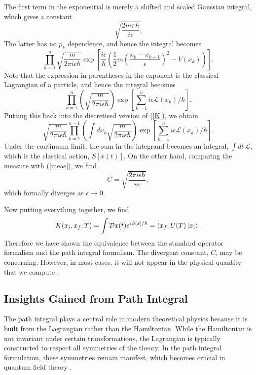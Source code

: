 \documentclass[12pt,a4paper]{article}
\begin{document}
The first term in the exponential is merely a shifted and scaled Gaussian integral, which gives a constant
\begin{equation}
    \sqrt{\frac{2m\pi\hbar}{i\epsilon}}.
\end{equation}
The latter has no $p_k$ dependence, and hence the integral becomes
\begin{equation}
     \prod_{k=1}^n\sqrt{\frac{m}{2\pi i\epsilon\hbar}}\exp\left[\frac{i\epsilon}{\hbar}\left(\frac{1}{2}m\left(\frac{x_k-x_{k-1}}{\epsilon}\right)^2 - V(x_k)\right)\right].
\end{equation}
Note that the expression in parentheses in the exponent is the classical Lagrangian of a particle, and hence the integral becomes
\begin{equation}
    \prod_{k=1}^n\left(\sqrt{\frac{m}{2\pi i\epsilon\hbar}}\right)\exp\left[\sum_{k=1}^ni\epsilon\mathcal{L}(x_k)/\hbar\right].
\end{equation}
Putting this back into the discretised version of (\ref{K}), we obtain
\begin{equation}
    \sqrt{\frac{m}{2\pi i\epsilon\hbar}}\prod_{k=1}^{n-1}\left(\int dx_k\sqrt{\frac{m}{2\pi i\epsilon\hbar}}\right)\exp\left[\sum_{k=1}^ni\epsilon\mathcal{L}(x_k)/\hbar\right].
\end{equation}
Under the continuum limit, the sum in the integrand becomes an integral, $\int dt \,\mathcal{L}$, which is the classical action,  $S[x(t)]$. On the other hand, comparing the measure with (\ref{meas}), we find
\begin{equation}
    C  = \sqrt{\frac{2\pi i\epsilon\hbar}{m}},
\end{equation}
which formally diverges as $\epsilon \to 0$. 

Now putting everything together, we find
\begin{equation}
    K(x_i,x_f;T) = \int \mathcal{D}x(t) e^{iS[x]/\hbar} = \bra{x_f}U(T)\ket{x_i}.
\end{equation}
Therefore we have shown the equivalence between the standard operator formalism and the path integral formalism.
The divergent constant, $C$, may be concerning. However, in most cases, it will not appear in the physical quantity that we compute \cite{TongQM, Feynman1948, Peskin, Schwartz}.

\subsection{Insights Gained from Path Integral}
The path integral plays a central role in modern theoretical physics because it is built from the Lagrangian rather than the Hamiltonian. While the Hamiltonian is not invariant under certain transformations, the Lagrangian is typically constructed to respect all symmetries of the theory. In the path integral formulation, these symmetries remain manifest, which becomes crucial in quantum field theory \cite{Peskin}.
\end{document}
